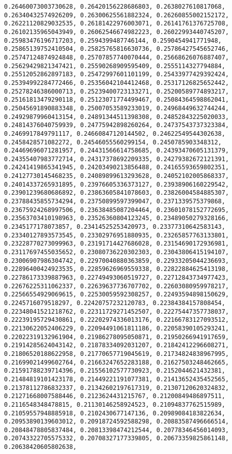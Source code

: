 \documentclass[11pt]{article}
\begin{document}
\begin{Verbatim}[commandchars=\\\{\}]
0.26460073003730628, 0.26420156228686803, 0.2638027610817068, 0.26340432574926209, 0.26300625561882324, 0.26260855002152172, 0.26221120829032535, 0.26181422976003071, 0.26141761376725708, 0.26102135965043949, 0.26062546674982223, 0.26022993440745207, 0.25983476196717203, 0.2594399487746144, 0.2590454941771948, 0.25865139752410504, 0.25825765816630736, 0.25786427545652746, 0.25747124874924848, 0.25707857740070444, 0.25668626076887407, 0.25629429821347421, 0.25590268909595409, 0.2555114327794884, 0.25512052862897183, 0.25472997601101199, 0.25433977429392424, 0.25394992284772466, 0.25356042104412468, 0.25317126825652442, 0.25278246386000713, 0.25239400723133271, 0.25200589774893217, 0.25161813479290118, 0.25123071774499467, 0.25084364598862041, 0.25045691890883348, 0.25007053589233019, 0.24968449632744244, 0.24929879960413154, 0.24891344511398308, 0.24852843225020033, 0.24814376040759939, 0.24775942898260264, 0.24737543737323384, 0.2469917849791117, 0.24660847120144502, 0.24622549544302638, 0.2458428571082272, 0.24546055560299154, 0.2450785903348312, 0.24469696071281957, 0.24431566614758685, 0.24393470605131379, 0.24355407983772714, 0.24317378692209335, 0.24279382672121391, 0.24241419865341945, 0.24203490213856488, 0.24165593659802351, 0.24127730145468235, 0.24089899613293628, 0.24052102005868337, 0.24014337265931895, 0.23976605336373127, 0.23938906160229542, 0.23901239680686892, 0.23863605841078603, 0.23826004584885307, 0.23788435855734294, 0.23750899597399047, 0.2371339575379868, 0.23675924268997506, 0.23638485087204464, 0.23601078152772695, 0.23563703410198963, 0.23526360804123245, 0.23489050279328166, 0.2345177178073857, 0.23414525253420973, 0.23377310642583143, 0.23340127893573545, 0.23302976951880935, 0.23265857763133801, 0.23228770273099963, 0.23191714427686028, 0.23154690172936981, 0.23117697455035652, 0.23080736220302303, 0.23043806415194107, 0.23006907986304742, 0.22970040880363859, 0.22933205044236693, 0.22896400424923535, 0.22859626969559338, 0.22822884625413198, 0.22786173339887963, 0.22749493060519727, 0.22712843734977423, 0.22676225311062337, 0.22639637736707702, 0.22603080959978217, 0.22566554929069615, 0.22530059592308257, 0.22493594898150629, 0.2245716079518297, 0.22420757232120783, 0.22384384157808454, 0.22348041521218762, 0.22311729271452507, 0.22275447357738037, 0.22239195729430861, 0.22202974336013176, 0.22166783127093512, 0.22130622052406229, 0.22094491061811186, 0.22058390105293241, 0.22022319132961904, 0.21986278095050871, 0.21950266941917659, 0.21914285624043142, 0.21878334092031207, 0.21842412296608271, 0.21806520188622958, 0.21770657719045619, 0.21734824838967995, 0.21699021499602764, 0.21663247652283188, 0.21627503248462665, 0.21591788239714396, 0.21556102577730923, 0.2152044621432381, 0.21484819101423178, 0.21449221191077381, 0.21413652435452565, 0.21378112786832337, 0.21342602197617319, 0.21307120620324832, 0.21271668007588446, 0.2123624431215767, 0.21200849486897511, 0.2116548348478815, 0.21130146258924523, 0.21094837762515989, 0.21059557948885918, 0.2102430677147136, 0.20989084183822634, 0.20953890139603012, 0.20918724592588298, 0.20883587496666514, 0.20848478805837484, 0.20813398474212544, 0.20778346456014093, 0.20743322705575332, 0.20708327177339805, 0.20673359825861148, 0.20638420605802638, 
\end{Verbatim}
\end{document}
